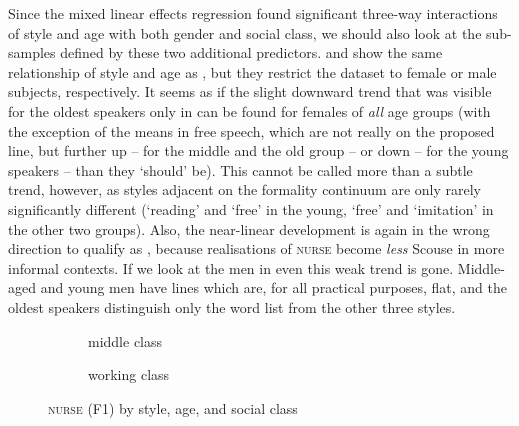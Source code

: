 Since the mixed linear effects regression found significant three-way interactions of style and age with both gender and social class, we should also look at the sub-samples defined by these two additional predictors.
 and  show the same relationship of style and age as , but they restrict the dataset to female or male subjects, respectively.
It seems as if the slight downward trend that was visible for the oldest speakers only in  can be found for females of \emph{all} age groups (with the exception of the means in free speech, which are not really on the proposed line, but further up -- for the middle and the old group -- or down -- for the young speakers -- than they `should' be).
This cannot be called more than a subtle trend, however, as styles adjacent on the formality continuum are only rarely significantly different (`reading' and `free' in the young, `free' and `imitation' in the other two groups).
Also, the near-linear development is again in the wrong direction to qualify as , because realisations of \textsc{nurse} become \emph{less} Scouse in more informal contexts.
If we look at the men in  even this weak trend is gone.
Middle-aged and young men have lines which are, for all practical purposes, flat, and the oldest speakers distinguish only the word list from the other three styles.

\begin{figure}
	
	\begin{subfigure}{.49\textwidth}
		
			\resizebox{\linewidth}{!}{} 
		\caption{middle class}
		\label{fig.line.f1.nurse.mc}
	\end{subfigure}
	\begin{subfigure}{.49\textwidth}
		
			\resizebox{\linewidth}{!}{} 
		\caption{working class}
		\label{fig.line.f1.nurse.wc}
	\end{subfigure}
	\caption{\textsc{nurse} (F1) by style, age, and social class}
\end{figure}

